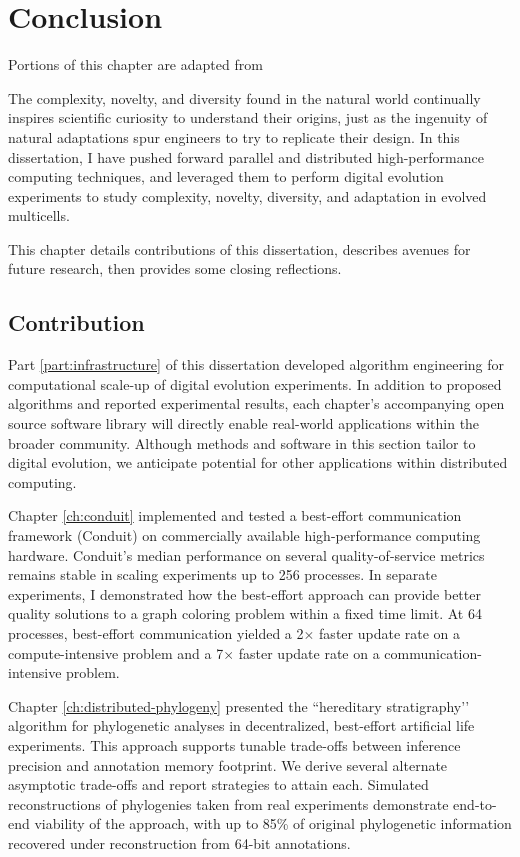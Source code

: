 \chapter{Conclusion}
\label{ch:conclusion}

\noindent
Portions of this chapter are adapted from ~\citep{moreno2020practical}

The complexity, novelty, and diversity found in the natural world continually inspires scientific curiosity to understand their origins, just as the ingenuity of natural adaptations spur engineers to try to replicate their design.
In this dissertation, I have pushed forward parallel and distributed high-performance computing techniques, and leveraged them to perform digital evolution experiments to study complexity, novelty, diversity, and adaptation in evolved multicells.

This chapter details contributions of this dissertation, describes avenues for future research, then provides some closing reflections.

\section{Contribution}

Part \ref{part:infrastructure} of this dissertation developed algorithm engineering for computational scale-up of digital evolution experiments.
In addition to proposed algorithms and reported experimental results, each chapter’s accompanying open source software library will directly enable real-world applications within the broader community.
Although methods and software in this section tailor to digital evolution, we anticipate potential for other applications within distributed computing.

Chapter \ref{ch:conduit} implemented and tested a best-effort communication framework (Conduit) on commercially available high-performance computing hardware.
Conduit's median performance on several quality-of-service metrics remains stable in scaling experiments up to 256 processes.
In separate experiments, I demonstrated how the best-effort approach can provide better quality solutions to a graph coloring problem within a fixed time limit.
At 64 processes, best-effort communication yielded a 2$\times$ faster update rate on a compute-intensive problem and a 7$\times$ faster update rate on a communication-intensive problem.

Chapter \ref{ch:distributed-phylogeny} presented the ``hereditary stratigraphy’’ algorithm for phylogenetic analyses in decentralized, best-effort artificial life experiments.
This approach supports tunable trade-offs between inference precision and annotation memory footprint.
We derive several alternate asymptotic trade-offs and report strategies to attain each.
Simulated reconstructions of phylogenies taken from real experiments demonstrate end-to-end viability of the approach, with up to 85\% of original phylogenetic information recovered under reconstruction from 64-bit annotations.


